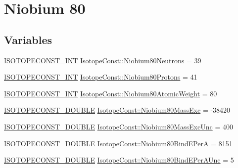 \hypertarget{group___isotope_const-_niobium-_nb80}{}\section{Niobium 80}
\label{group___isotope_const-_niobium-_nb80}
\subsection*{Variables}
\begin{DoxyCompactItemize}
\item 
\mbox{\hyperlink{group___isotope_const-_macros_ga5f18360b3e99483a35c32d789e62621c}{I\+S\+O\+T\+O\+P\+E\+C\+O\+N\+S\+T\+\_\+\+I\+NT}} \mbox{\hyperlink{group___isotope_const-_niobium-_nb80_gafb965bc233aaf4d5f0e6096a3c56dd94}{Isotope\+Const\+::\+Niobium80\+Neutrons}} = 39
\item 
\mbox{\hyperlink{group___isotope_const-_macros_ga5f18360b3e99483a35c32d789e62621c}{I\+S\+O\+T\+O\+P\+E\+C\+O\+N\+S\+T\+\_\+\+I\+NT}} \mbox{\hyperlink{group___isotope_const-_niobium-_nb80_ga8bef95ab3a5ab5c38d074b78041ca425}{Isotope\+Const\+::\+Niobium80\+Protons}} = 41
\item 
\mbox{\hyperlink{group___isotope_const-_macros_ga5f18360b3e99483a35c32d789e62621c}{I\+S\+O\+T\+O\+P\+E\+C\+O\+N\+S\+T\+\_\+\+I\+NT}} \mbox{\hyperlink{group___isotope_const-_niobium-_nb80_ga8e2f74988517d877b8ab9a744b745aa4}{Isotope\+Const\+::\+Niobium80\+Atomic\+Weight}} = 80
\item 
\mbox{\hyperlink{group___isotope_const-_macros_ga8f45a7272ce02c0b4c65c44636ed719a}{I\+S\+O\+T\+O\+P\+E\+C\+O\+N\+S\+T\+\_\+\+D\+O\+U\+B\+LE}} \mbox{\hyperlink{group___isotope_const-_niobium-_nb80_ga4afc2a7dd773f3ea1b5eb767651717e4}{Isotope\+Const\+::\+Niobium80\+Mass\+Exc}} = -\/38420
\item 
\mbox{\hyperlink{group___isotope_const-_macros_ga8f45a7272ce02c0b4c65c44636ed719a}{I\+S\+O\+T\+O\+P\+E\+C\+O\+N\+S\+T\+\_\+\+D\+O\+U\+B\+LE}} \mbox{\hyperlink{group___isotope_const-_niobium-_nb80_ga57517765703d595f1d437c0186fdc2ab}{Isotope\+Const\+::\+Niobium80\+Mass\+Exc\+Unc}} = 400
\item 
\mbox{\hyperlink{group___isotope_const-_macros_ga8f45a7272ce02c0b4c65c44636ed719a}{I\+S\+O\+T\+O\+P\+E\+C\+O\+N\+S\+T\+\_\+\+D\+O\+U\+B\+LE}} \mbox{\hyperlink{group___isotope_const-_niobium-_nb80_gad0620855f1ccc1cb7692ad31f8c2431e}{Isotope\+Const\+::\+Niobium80\+Bind\+E\+PerA}} = 8151
\item 
\mbox{\hyperlink{group___isotope_const-_macros_ga8f45a7272ce02c0b4c65c44636ed719a}{I\+S\+O\+T\+O\+P\+E\+C\+O\+N\+S\+T\+\_\+\+D\+O\+U\+B\+LE}} \mbox{\hyperlink{group___isotope_const-_niobium-_nb80_ga072ee3994e24b741b0d37b6f2eb8d31f}{Isotope\+Const\+::\+Niobium80\+Bind\+E\+Per\+A\+Unc}} = 5

\end{DoxyCompactItemize}
